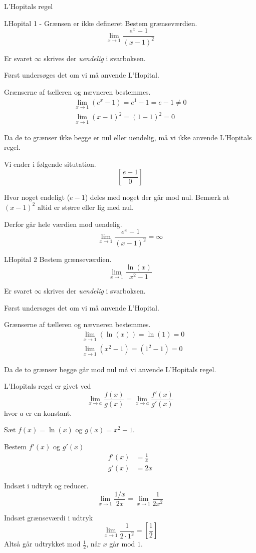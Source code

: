 \documentclass{article}
\begin{document}
L'Hopitals regel
\tableofcontents
\newpage

\begin{exercise}{LHopital 1 - Grænsen er ikke defineret}
Bestem grænseværdien.
\[
\lim_{x \to 1} \frac{e^x - 1}{(x - 1)^2}
\]

Er svaret $\infty$ skrives der \emph{uendelig} i svarboksen.


\hint
Først undersøges det om vi må anvende L'Hopital.

\hint
Grænserne af tælleren og nævneren bestemmes.
\begin{align*}
\lim_{x \to 1} (e^x - 1) = e^1 - 1 = e - 1 \neq 0 \\
\lim_{x \to 1} (x - 1)^2 = (1 - 1)^2 = 0
\end{align*}

\hint
Da de to grænser ikke begge er nul eller uendelig, må vi ikke anvende L'Hopitals regel. 

\hint
Vi ender i følgende situtation.
\[
\left[ \frac{e - 1}{0} \right]
\]

\hint
Hvor noget endeligt ($e - 1$) deles med noget der går mod nul.
Bemærk at $(x - 1)^2$ altid er større eller lig med nul. 

Derfor går hele værdien mod uendelig.
\[
\lim_{x \to 1} \frac{e^x - 1}{(x - 1)^2} = \infty
\]

\end{exercise}

\begin{exercise}{LHopital 2}
Bestem grænseværdien.
\[
\lim_{x \to 1} \frac{\ln(x)}{x^2 - 1}
\] 
	
Er svaret $\infty$ skrives der \emph{uendelig} i svarboksen.
	

\hint
Først undersøges det om vi må anvende L'Hopital.

\hint
Grænserne af tælleren og nævneren bestemmes.
\begin{align*}
	&\lim_{x \to 1} (\ln(x)) = \ln(1) = 0 \\
	&\lim_{x \to 1} (x^2 - 1) = (1^2 - 1) = 0
\end{align*}

\hint
Da de to grænser begge går mod nul må vi  anvende L'Hopitals regel. 

\hint
L'Hopitals regel er givet ved
\[
\lim_{x \to a} \frac{f(x)}{g(x)} = \lim_{x \to a} \frac{f'(x)}{g'(x)} 
\]
hvor $a$  er en konstant.

\hint
Sæt $f(x) = \ln(x)$ og $g(x) = x^2-1$. 

\hint
Bestem $f'(x)$ og $g'(x)$
\begin{align*}
	f'(x) &= \frac{1}{x} \\
	g'(x) &= 2x
\end{align*}

\hint
Indsæt i udtryk og reducer. 
\[
\lim_{x \to 1} \frac{1/x}{2x} = \lim_{x \to 1} \frac{1}{2x^2} 
\]

\hint
Indsæt grænseværdi i udtryk
\[
\lim_{x \to 1} \frac{1}{2 \cdot 1^2}  = \left[ \frac{1}{2}  \right] 
\]
Altså går udtrykket mod $\frac{1}{2}$, når $x$ går mod $1$. 
		
\end{exercise}
\end{document}
